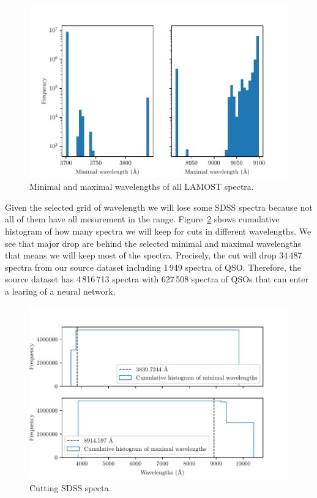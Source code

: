 \begin{figure}
	\includegraphics[width=\textwidth]{img/wavemin_wavemax_hist.pdf}
	\caption{Minimal and maximal wavelengths of all LAMOST spectra.}
	\label{wavemin_wavemax_hist}
\end{figure}

Given the selected grid of wavelength we will lose some SDSS spectra
because not all of them have all mesurement in the range.
Figure~\ref{waves_cumulative_hist} shows cumulative histogram of how many spectra we will keep for cuts in different wavelengths.
We see that major drop are behind the selected minimal and maximal wavelengths
that means we will keep most of the spectra.
Precisely, the cut will drop 34\,487 spectra from our source dataset
including 1\,949 spectra of QSO.
Therefore, the source dataset has 4\,816\,713 spectra with 627\,508 spectra of QSOs that can enter a learing of a neural network.

\begin{figure}
	\includegraphics[width=\textwidth]{img/waves_cumulative_hist.pdf}
	\caption{Cutting SDSS specta.}
	\label{waves_cumulative_hist}
\end{figure}


